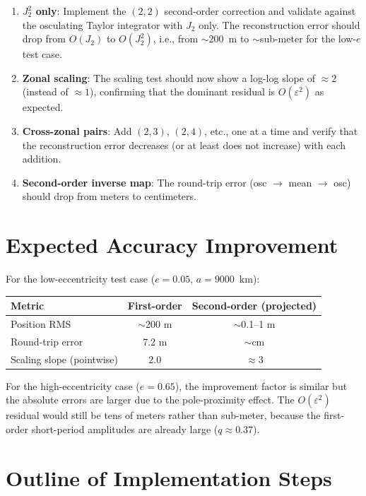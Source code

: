 \documentclass[11pt]{article}
\newcommand{\eps}{\varepsilon}
\begin{document}
\begin{enumerate}
\item \textbf{$J_2^2$ only}: Implement the $(2,2)$ second-order correction
and validate against the osculating Taylor integrator with $J_2$ only. The
reconstruction error should drop from $O(J_2)$ to $O(J_2^2)$, i.e., from
$\sim$200~m to $\sim$sub-meter for the low-$e$ test case.

\item \textbf{Zonal scaling}: The scaling test should now show a log-log
slope of $\approx 2$ (instead of $\approx 1$), confirming that the dominant
residual is $O(\eps^2)$ as expected.

\item \textbf{Cross-zonal pairs}: Add $(2,3)$, $(2,4)$, etc., one at a time
and verify that the reconstruction error decreases (or at least does not
increase) with each addition.

\item \textbf{Second-order inverse map}: The round-trip error
(osc $\to$ mean $\to$ osc) should drop from meters to centimeters.
\end{enumerate}


\section{Expected Accuracy Improvement}

For the low-eccentricity test case ($e = 0.05$, $a = 9000$~km):

\begin{center}
\begin{tabular}{lcc}
\toprule
Metric & First-order & Second-order (projected) \\
\midrule
Position RMS & $\sim$200 m & $\sim$0.1--1 m \\
Round-trip error & 7.2 m & $\sim$cm \\
Scaling slope (pointwise) & 2.0 & $\approx 3$ \\
\bottomrule
\end{tabular}
\end{center}

For the high-eccentricity case ($e = 0.65$), the improvement factor is
similar but the absolute errors are larger due to the pole-proximity effect.
The $O(\eps^2)$ residual would still be tens of meters rather than sub-meter,
because the first-order short-period amplitudes are already large ($q \approx
0.37$).


\section{Outline of Implementation Steps}
\end{document}
